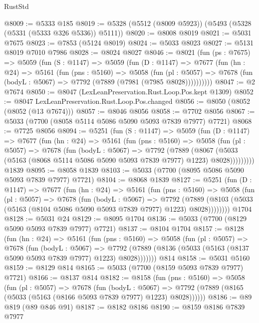 \begin{lexlean}{RustStd}
\begin{coremodule}
@8009 := @5333 @185
@8019 := @5328 (@5512 (@8009 @5923)) (@5493 (@5328 (@5331 (@5333 @326 @5336)) @5111))
@8020 := @8008 @8019
@8021 := @5031 @7675
@8023 := @7853 (@5124 @8019)
@8024 := @5033 @8023
@8027 := @5131 @8019 @7010 @7986
@8028 := @8024 @8027
@8046 := @8021
    (fun (ps : @7675) =>
    @5059
      (fun (S : @1147) =>
      @5059
        (fun (D : @1147) =>
        @7677
          (fun (hn : @24) =>
          @5161
            (fun (pns : @5160) =>
            @5058
              (fun (pl : @5057) =>
              @7678 (fun (bodyL : @5067) => @7792 (@7889 (@7981 (@7985 @8028))))))))))
@8047 := @2 @7674
@8050 := @8047 (LexLeanPreservation.Rust.Loop.Pos.kept @1309)
@8052 := @8047 LexLeanPreservation.Rust.Loop.Pos.changed
@8056 := @8050 (@8052 (@8052 (@13 @7674)))
@8057 := @8046 @8056
@8058 := @7702 @8056
@8067 := @5033 (@7700 (@8058 @5114 @5086 @5090 @5093 @7839 @7977) @7721)
@8068 := @7725 @8056
@8094 := @5251
    (fun (S : @1147) =>
    @5059
      (fun (D : @1147) =>
      @7677
        (fun (hn : @24) =>
        @5161
          (fun (pns : @5160) =>
          @5058
            (fun (pl : @5057) =>
            @7678
              (fun (bodyL : @5067) =>
              @7792
                (@7889
                  (@8067
                    (@5033 (@5163 (@8068 @5114 @5086 @5090 @5093 @7839 @7977) @1223) @8028)))))))))
    @1839
@8095 := @8058 @1839
@8103 := @5033 (@7700 (@8095 @5086 @5090 @5093 @7839 @7977) @7721)
@8104 := @8068 @1839
@8127 := @5251
    (fun (D : @1147) =>
    @7677
      (fun (hn : @24) =>
      @5161
        (fun (pns : @5160) =>
        @5058
          (fun (pl : @5057) =>
          @7678
            (fun (bodyL : @5067) =>
            @7792
              (@7889 (@8103 (@5033 (@5163 (@8104 @5086 @5090 @5093 @7839 @7977) @1223) @8028))))))))
    @1704
@8128 := @5031 @24
@8129 := @8095 @1704
@8136 := @5033 (@7700 (@8129 @5090 @5093 @7839 @7977) @7721)
@8137 := @8104 @1704
@8157 := @8128
    (fun (hn : @24) =>
    @5161
      (fun (pns : @5160) =>
      @5058
        (fun (pl : @5057) =>
        @7678
          (fun (bodyL : @5067) =>
          @7792 (@7889 (@8136 (@5033 (@5163 (@8137 @5090 @5093 @7839 @7977) @1223) @8028)))))))
    @814
@8158 := @5031 @5160
@8159 := @8129 @814
@8165 := @5033 (@7700 (@8159 @5093 @7839 @7977) @7721)
@8166 := @8137 @814
@8182 := @8158
    (fun (pns : @5160) =>
    @5058
      (fun (pl : @5057) =>
      @7678
        (fun (bodyL : @5067) =>
        @7792 (@7889 (@8165 (@5033 (@5163 (@8166 @5093 @7839 @7977) @1223) @8028))))))
@8186 := @89 @819 (@89 @846 @91)
@8187 := @8182 @8186
@8190 := @8159 @8186 @7839 @7977

\end{coremodule}
\end{lexlean}
